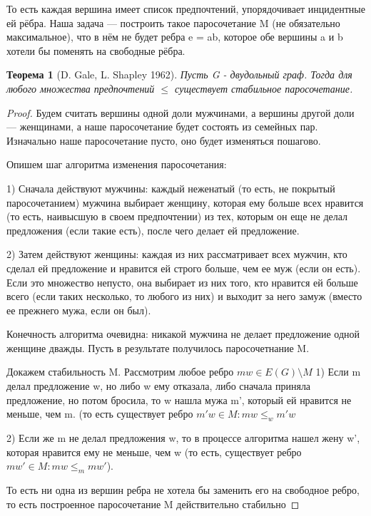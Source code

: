 \documentclass{article}
\renewcommand{\le}{\leqslant}
\newtheorem{theorem}{Теорема}
\theoremstyle{definition}
\theoremstyle{remark}
\begin{document}
То есть каждая вершина имеет список предпочтений, упорядочивает инцидентные ей рёбра. Наша задача — построить такое паросочетание M (не обязательно максимальное), что в нём не будет ребра e = ab, которое обе вершины a и b хотели бы поменять на свободные рёбра.

\begin{theorem} [D. Gale, L. Shapley 1962]
    Пусть G - двудольный граф. Тогда для любого множества предпочтений $\le$ существует стабильное паросочетание. 
\end{theorem}
   
\begin{proof}
Будем считать вершины одной доли
мужчинами, а вершины другой доли — женщинами, а
наше паросочетание будет состоять из семейных пар.
Изначально наше паросочетание пусто, оно будет
изменяться пошагово. 

Опишем шаг алгоритма изменения паросочетания:

1) Сначала действуют мужчины:
каждый неженатый (то есть, не покрытый
паросочетанием) мужчина выбирает женщину, которая
ему больше всех нравится (то есть, наивысшую в своем
предпочтении) из тех, которым он еще не делал
предложения (если такие есть), после чего делает ей
предложение.

2) Затем действуют женщины:
каждая из них рассматривает всех мужчин, кто сделал ей
предложение и нравится ей строго больше, чем ее муж
(если он есть). Если это множество непусто, она
выбирает из них того, кто нравится ей больше всего
(если таких несколько, то любого из них) и выходит за
него замуж (вместо ее прежнего мужа, если он был).


Конечность алгоритма очевидна: никакой мужчина не
делает предложение одной женщине дважды. Пусть в
результате получилось паросочетнание M.

Докажем стабильность M. Рассмотрим любое ребро $mw \in E(G) \setminus M$
1) Если m делал предложение w, но либо w ему отказала,
либо сначала приняла предложение, но потом бросила, то
w нашла мужа m', который ей нравится не меньше, чем m. (то есть существует ребро $m'w \in M: mw \le_w m'w $

2) Если же m не делал предложения w, то в процессе
алгоритма нашел жену w', которая нравится ему не
меньше, чем w (то есть, существует ребро $mw' \in M : mw \le_m mw'$).

То есть ни одна из вершин ребра не хотела бы заменить его на свободное ребро, то есть построенное паросочетание M действительно стабильно
\end{proof}
\end{document}
